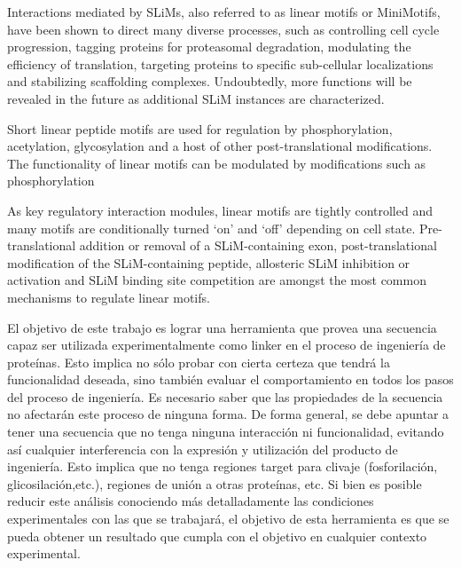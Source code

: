 Interactions mediated by SLiMs, also referred to as linear motifs or MiniMotifs, have been shown to direct many diverse processes, such as controlling cell cycle progression, 
tagging proteins for proteasomal degradation, modulating the efficiency of translation, targeting proteins to specific sub-cellular localizations and stabilizing scaffolding complexes.
Undoubtedly, more functions will be revealed in the future as additional SLiM instances are characterized.

Short linear peptide motifs are used for regulation by phosphorylation, acetylation, glycosylation and a host of other post-translational modifications.
The functionality of linear motifs can be modulated by modifications such as phosphorylation

As key regulatory interaction modules, linear motifs are tightly controlled and many motifs are conditionally turned ‘on’ and ‘off’ depending on cell state. Pre-translational addition or removal of a SLiM-containing exon,
post-translational modification of the SLiM-containing peptide, allosteric SLiM inhibition or activation and SLiM binding site competition are amongst the most common mechanisms to regulate linear motifs.



El objetivo de este trabajo es lograr una herramienta que provea una secuencia capaz ser utilizada experimentalmente como linker en el proceso de ingeniería de proteínas. 
Esto implica no sólo probar con cierta certeza que tendrá la funcionalidad deseada, sino también evaluar el comportamiento en todos los pasos del proceso de ingeniería. 
Es necesario saber que las propiedades de la secuencia no afectarán este proceso de ninguna forma.
De forma general, se debe apuntar a tener una secuencia que no tenga ninguna interacción ni funcionalidad, evitando así cualquier interferencia con la expresión y utilización del producto 
de ingeniería. Esto implica que no tenga regiones target para clivaje (fosforilación, glicosilación,etc.), regiones de unión a otras proteínas, etc.
Si bien es posible reducir este análisis conociendo más detalladamente las condiciones experimentales con las que se trabajará, el objetivo de esta herramienta es que se pueda obtener 
un resultado que cumpla con el objetivo en cualquier contexto experimental. 

